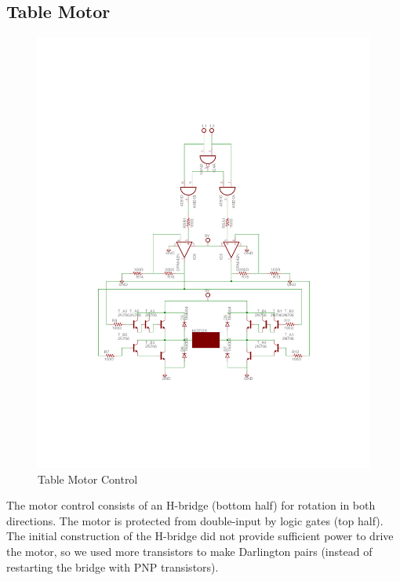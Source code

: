 \documentclass[a4paper, 11pt]{article}
\begin{document}
	\subsection{Table Motor}
	\begin{figure}[!ht]
		\centering
		\vspace{-4cm}
		\includegraphics[scale=.8]{report-images/bidirectional-motor-driver}
		\vspace{-4cm}
		\caption{Table Motor Control}
	\end{figure}
	\noindent The motor control consists of an H-bridge (bottom half) for rotation in both directions.  The motor is protected from double-input by logic gates (top half).  The initial construction of the H-bridge did not provide sufficient power to drive the motor, so we used more transistors to make Darlington pairs (instead of restarting the bridge with PNP transistors).
\newpage
\end{document}
